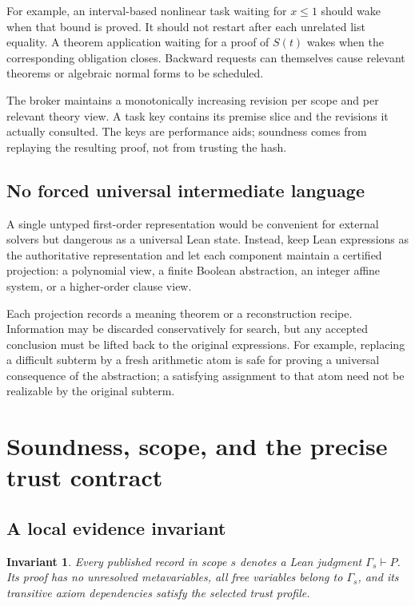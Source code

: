 \documentclass[11pt,a4paper]{article}
\newtheorem{invariant}[proposition]{Invariant}
\newcommand{\ctx}{\Gamma}
\newcommand{\judg}[2]{#1\vdash #2}
\begin{document}
For example, an interval-based nonlinear task waiting for $x\leq 1$ should wake when that bound is proved. It should not restart after each unrelated list equality. A theorem application waiting for a proof of $S(t)$ wakes when the corresponding obligation closes. Backward requests can themselves cause relevant theorems or algebraic normal forms to be scheduled.

The broker maintains a monotonically increasing revision per scope and per relevant theory view. A task key contains its premise slice and the revisions it actually consulted. The keys are performance aids; soundness comes from replaying the resulting proof, not from trusting the hash.

\subsection{No forced universal intermediate language}

A single untyped first-order representation would be convenient for external solvers but dangerous as a universal Lean state. Instead, keep Lean expressions as the authoritative representation and let each component maintain a certified projection: a polynomial view, a finite Boolean abstraction, an integer affine system, or a higher-order clause view.

Each projection records a meaning theorem or a reconstruction recipe. Information may be discarded conservatively for search, but any accepted conclusion must be lifted back to the original expressions. For example, replacing a difficult subterm by a fresh arithmetic atom is safe for proving a universal consequence of the abstraction; a satisfying assignment to that atom need not be realizable by the original subterm.

\section{Soundness, scope, and the precise trust contract}
\label{sec:soundness}

\subsection{A local evidence invariant}

\begin{invariant}
Every published record in scope $s$ denotes a Lean judgment $\judg{\ctx_s}{P}$. Its proof has no unresolved metavariables, all free variables belong to $\ctx_s$, and its transitive axiom dependencies satisfy the selected trust profile.
\end{invariant}
\end{document}
